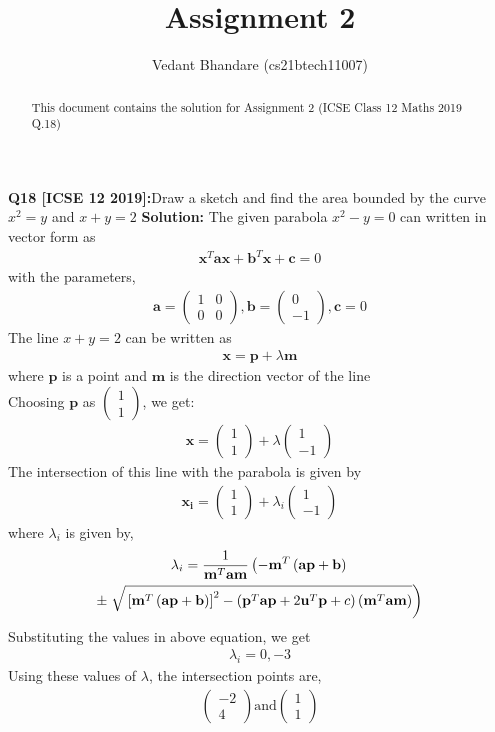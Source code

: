 \documentclass[journal,12pt,twocolumn]{IEEEtran}
\title{Assignment 2}
\author{ Vedant Bhandare (cs21btech11007)}
\providecommand{\sbrak}[1]{\ensuremath{{}\left[#1\right]}}
\providecommand{\brak}[1]{\ensuremath{\left(#1\right)}}
\providecommand{\lbrak}[1]{\ensuremath{\left(#1\right.}}
\providecommand{\rbrak}[1]{\ensuremath{\left.#1\right)}}
\theoremstyle{remark}
\newcommand{\myvec}[1]{\ensuremath{\begin{pmatrix}#1\end{pmatrix}}}
\let\vec\mathbf
\begin{document}
\maketitle
\begin{abstract}
This document contains the solution for Assignment 2 (ICSE Class 12 Maths 2019 Q.18)
\end{abstract}
\begin{flushleft}
\textbf{Q18 [ICSE 12 2019]:}Draw a sketch and find the area bounded by the curve $x^2 = y$ and $x + y = 2$
\textbf{Solution: } The given parabola $x^2 - y = 0$ can written in vector form as
\begin{align}
    \vec{x}^T\vec{a}\vec{x} + \vec{b}^T\vec{x} + \vec{c} = 0
\end{align}
with the parameters,
\begin{align}
    \vec{a} = \myvec{1 & 0 \\ 0 & 0}, \vec{b} = \myvec{0 \\ -1}, \vec{c} = 0
\end{align}
The line $x + y = 2$ can be written as
\begin{align}
    \vec{x} = \vec{p} + \lambda \vec{m}
\end{align}
where $\vec{p}$ is a point and $\vec{m}$ is the direction vector of the line\\
Choosing $\vec{p}$ as $\myvec{1 \\ 1}$, we get:
\begin{align}
    \vec{x} = \myvec{1 \\ 1} + \lambda \myvec{1 \\ -1}
\end{align}
The intersection of this line with the parabola is given by
\begin{align}
    \vec{x_i} = \myvec{1 \\ 1} + \lambda_i \myvec{1 \\ -1}
\end{align}
where $\lambda_i$ is given by,
\begin{multline}
\footnotesize
    \lambda_i = \frac{1}
{
\vec{m}^T\vec{a}\vec{m}
}
\lbrak{-\vec{m}^T\brak{\vec{a}\vec{p}+\vec{b}}}
\\
\pm
\rbrak{\sqrt{\sbrak{\vec{m}^T\brak{\vec{a}\vec{p}+\vec{b}}
}^2
-
\brak
{
\vec{p}^T\vec{a}\vec{p} + 2\vec{u}^T\vec{p} +c
}
\brak{\vec{m}^T\vec{a}\vec{m}}
}
}
\label{eq:tangent_roots}
\end{multline}
Substituting the values in above equation, we get
\begin{align}
    \lambda_i = 0, -3
\end{align}
Using these values of $\lambda$, the intersection points are,
\begin{align}
    \myvec{-2 \\ 4} \text{and} \myvec{1 \\ 1}
\end{align}


\end{flushleft}
\end{document}

